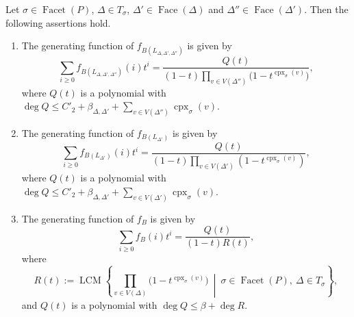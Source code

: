 \begin{thm}\label{thm:main}
Let $\sigma \in \operatorname{Facet}(P)$, $\Delta \in T_{\sigma}$, 
$\Delta ' \in \operatorname{Face}(\Delta)$ and $\Delta '' \in \operatorname{Face}(\Delta ')$. 
Then the following assertions hold. 

\begin{enumerate}
\item 
The generating function of $f_{B ( L_{\Delta, \Delta ', \Delta''} )}$ is given by 
\[
\sum _{i \ge 0} f_{B ( L_{\Delta, \Delta ', \Delta''} )}(i) t^i = 
\frac{Q(t)}{(1-t) \prod _{v \in V(\Delta '')} \bigl( 1 - t^{\operatorname{cpx}_{\sigma}(v)} \bigr)}, 
\]
where $Q(t)$ is a polynomial with $\deg Q \le C'_2 + \beta _{\Delta, \Delta '} + \sum _{v \in V(\Delta '')} \operatorname{cpx}_{\sigma}(v)$. 

\item 
The generating function of $f_{B ( L_{\Delta '} )}$ is given by 
\[
\sum _{i \ge 0} f_{B ( L_{\Delta '} )}(i) t^i = 
\frac{Q(t)}{(1-t) \prod _{v \in V(\Delta ')} \left( 1 - t^{\operatorname{cpx}_{\sigma}(v)} \right)}, 
\]
where $Q(t)$ is a polynomial with $\deg Q \le C'_2 + \beta _{\Delta, \Delta '} + \sum _{v \in V(\Delta ')} \operatorname{cpx}_{\sigma}(v)$. 

\item 
The generating function of $f_{B}$ is given by 
\[
\sum _{i \ge 0} f_{B}(i) t^i = 
\frac{Q(t)}{(1-t)R(t)}, 
\]
where 
\[
R(t) := \operatorname{LCM} \left\{ \prod _{v \in V(\Delta)} \bigl( 1 - t^{\operatorname{cpx}_{\sigma}(v)} \bigr) \ \middle | \ \sigma \in \operatorname{Facet}(P),\ \Delta \in T_{\sigma} \right \},  
\]
and $Q(t)$ is a polynomial with $\deg Q \le \beta + \deg R$. 
\end{enumerate}
\end{thm}
